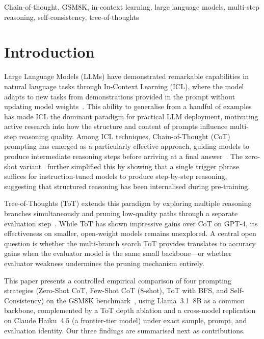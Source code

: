\documentclass[conference]{IEEEtran}
\begin{document}
\begin{IEEEkeywords}
Chain-of-thought, GSM8K, in-context learning, large language models,
multi-step reasoning, self-consistency, tree-of-thoughts
\end{IEEEkeywords}

\section{Introduction}
\label{sec:intro}

Large Language Models (LLMs) have demonstrated remarkable capabilities
in natural language tasks through In-Context Learning (ICL), where the
model adapts to new tasks from demonstrations provided in the prompt
without updating model weights~\cite{brown2020gpt3}.
This ability to generalise from a handful of examples has made ICL
the dominant paradigm for practical LLM deployment, motivating active
research into how the structure and content of prompts influence
multi-step reasoning quality.
Among ICL techniques, Chain-of-Thought (CoT) prompting has emerged as
a particularly effective approach, guiding models to produce
intermediate reasoning steps before arriving at a final
answer~\cite{wei2022cot}.
The zero-shot variant~\cite{kojima2022zeroshot} further simplified
this by showing that a single trigger phrase suffices for
instruction-tuned models to produce step-by-step reasoning, suggesting
that structured reasoning has been internalised during pre-training.

Tree-of-Thoughts (ToT) extends this paradigm by exploring multiple
reasoning branches simultaneously and pruning low-quality paths through
a separate evaluation step~\cite{yao2023tot}.
While ToT has shown impressive gains over CoT on GPT-4, its
effectiveness on smaller, open-weight models remains unexplored.
A central open question is whether the multi-branch search ToT
provides translates to accuracy gains when the evaluator model is the
same small backbone---or whether evaluator weakness undermines the
pruning mechanism entirely.

This paper presents a controlled empirical comparison of four
prompting strategies (Zero-Shot CoT, Few-Shot CoT (8-shot), ToT
with BFS, and Self-Consistency) on the GSM8K
benchmark~\cite{cobbe2021gsm8k}, using Llama~3.1~8B as a common
backbone, complemented by a ToT depth ablation and a cross-model
replication on Claude Haiku~4.5 (a frontier-tier model) under exact
sample, prompt, and evaluation identity.
Our three findings are summarised next as contributions.
\end{document}
